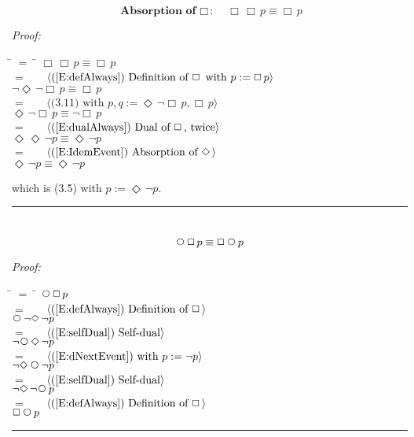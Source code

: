 \documentclass[fleqn, leqno]{article}
\newcommand{\lgap}{2pt} %
\newcommand{\mymathindent}{24pt} %
\newcommand{\Next}{\;\,\text{\raisebox{3.5pt}{\circle{6}}}}
\newcommand{\Event}{\Diamond\,}
\newcommand{\Always}{\Box\,}
\newcommand{\myqed}{\hfill\rule[-.23ex]{1.2ex}{2.0ex}}
\newcommand{\Gll} {\langle} %
\newcommand{\Ggg} {\rangle} %
\newcommand{\Hint}[1] {\ \ \ $\Gll \mbox{#1} \Ggg$ } %
\begin{document}
\begin{equation}\label{E:IdemAlways}
\textbf{Absorption of $\Always$:}\quad \Always\Always p \equiv \Always p
\end{equation}

\emph{Proof:}
\begin{tabbing}
\hspace{\mymathindent} \= $= \;$ \= \kill
\> \> $\Always\Always p \equiv \Always p$\\[\lgap]
\> $=$ \> \Hint{(\ref{E:defAlways}) Definition of $\Always$ with $p := \Always p$}\\[\lgap]
\> \> $\lnot\Event\lnot\Always p \equiv \Always p$\\[\lgap]
\> $=$ \> \Hint{(3.11) with $p,q := \Event\lnot\Always p, \Always p$}\\[\lgap]
\> \> $\Event\lnot\Always p \equiv \lnot\Always p$\\[\lgap]
\> $=$ \> \Hint{(\ref{E:dualAlways}) Dual of $\Always$, twice}\\[\lgap]
\> \> $\Event\Event\lnot p \equiv \Event\lnot p$\\[\lgap]
\> $=$ \> \Hint{(\ref{E:IdemEvent}) Absorption of $\Event$}\\[\lgap]
\> \> $\Event\lnot p \equiv \Event\lnot p$\\[\lgap]
\end{tabbing}
which is (3.5) with $p := \Event\lnot p$. \myqed\\[\lgap]


\begin{equation}\label{E:dNextAlways}
\Next\Always p \equiv \Always\Next p
\end{equation}

\emph{Proof:}
\begin{tabbing}
\hspace{\mymathindent} \= $= \;$ \= \kill
\> \> $\Next\Always p$\\[\lgap]
\> $=$ \> \Hint{(\ref{E:defAlways}) Definition of $\Always$}\\[\lgap]
\> \> $\Next\lnot\Event\lnot p$\\[\lgap]
\> $=$ \> \Hint{(\ref{E:selfDual}) Self-dual}\\[\lgap]
\> \> $\lnot\Next\Event\lnot p$\\[\lgap]
\> $=$ \> \Hint{(\ref{E:dNextEvent}) with $p := \lnot p$}\\[\lgap]
\> \> $\lnot\Event\Next\lnot p$\\[\lgap]
\> $=$ \> \Hint{(\ref{E:selfDual}) Self-dual}\\[\lgap]
\> \> $\lnot\Event\lnot\Next p$\\[\lgap]
\> $=$ \> \Hint{(\ref{E:defAlways}) Definition of $\Always$}\\[\lgap]
\> \> $\Always\Next p$\\[\lgap]
\end{tabbing}
\myqed\\[\lgap]
\end{document}
